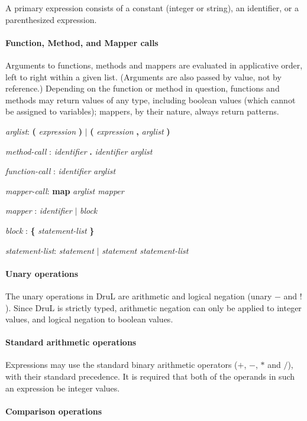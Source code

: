 A primary expression consists of a constant (integer or string), an identifier, or a parenthesized expression.

\paragraph{Function, Method, and Mapper calls}

Arguments to functions, methods and mappers are evaluated in applicative order, left to right within a given list.  (Arguments are also passed by value, not by reference.)  Depending on the function or method in question, functions and methods may return values of any type, including boolean values (which cannot be assigned to variables); mappers, by their nature, always return patterns.

\emph{arglist}: \textbf ( \emph{expression} \textbf ) $|$  \textbf ( \emph{expression}
\textbf{,} \emph{arglist} \textbf )

\emph{method-call} : \emph{identifier} \textbf . \emph{identifier arglist}

\emph{function-call} : \emph{identifier} \emph{arglist}

\emph{mapper-call}:  \textbf{map} \emph{arglist mapper}

\emph{mapper} : \emph{identifier} $|$ \emph{block}

\emph{block} : \textbf{\{} \emph{statement-list} \textbf{\}}

\emph{statement-list}: \emph{statement} $|$ \emph{statement statement-list}

\paragraph{Unary operations}

The unary operations in DruL are arithmetic and logical negation (unary $-$ and $!$).  Since DruL is strictly typed, arithmetic negation can only be applied to integer values, and logical negation to boolean values.

\paragraph{Standard arithmetic operations}

Expressions may use the standard binary arithmetic operators ($+$, $-$, $*$ and $/$), with their standard precedence.  It is required that both of the operands in such an expression be integer values.

\paragraph{Comparison operations}

